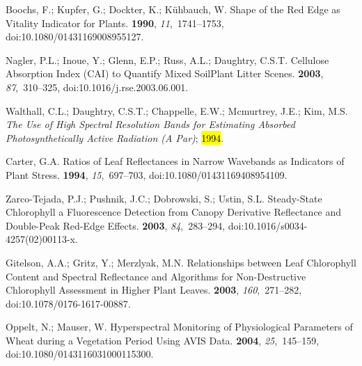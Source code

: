 \documentclass[remotesensing,article,accept,moreauthors,pdftex]{Definitions/mdpi}
\begin{document}
\begin{thebibliography}{999}
Boochs, F.; Kupfer, G.; Dockter, K.; K{\"u}hbauch, W.
\newblock Shape of the Red Edge as Vitality Indicator for Plants.
 {\bf 1990}, {\em
  11},~1741--1753, doi:10.1080/01431169008955127.

Nagler, P.L.; Inoue, Y.; Glenn, E.P.; Russ, A.L.; Daughtry, C.S.T.
\newblock Cellulose Absorption Index ({{CAI}}) to Quantify Mixed
  Soil\textendash Plant Litter Scenes.
 {\bf 2003}, {\em 87},~310--325, doi:10.1016/j.rse.2003.06.001.

Walthall, C.L.; Daughtry, C.S.T.; Chappelle, E.W.; Mcmurtrey, J.E.; Kim, M.S.
\newblock \emph{The {{Use}} of {{High Spectral Resolution Bands}} for {{Estimating
  Absorbed Photosynthetically Active Radiation}} ({{A Par}})}; { \hl{1994}}.

Carter, G.A.
\newblock Ratios of Leaf Reflectances in Narrow Wavebands as Indicators of
  Plant Stress.
 {\bf 1994}, {\em
  15},~697--703, doi:10.1080/01431169408954109.

{Zarco-Tejada}, P.J.; Pushnik, J.C.; Dobrowski, S.; Ustin, S.L.
\newblock Steady-State Chlorophyll a Fluorescence Detection from Canopy
  Derivative Reflectance and Double-Peak Red-Edge Effects.
 {\bf 2003}, {\em 84},~283--294, doi:10.1016/s0034-4257(02)00113-x.

Gitelson, A.A.; Gritz, Y.; Merzlyak, M.N.
\newblock Relationships between Leaf Chlorophyll Content and Spectral
  Reflectance and Algorithms for Non-Destructive Chlorophyll Assessment in
  Higher Plant Leaves.
 {\bf 2003}, {\em 160},~271--282, doi:10.1078/0176-1617-00887.

Oppelt, N.; Mauser, W.
\newblock Hyperspectral Monitoring of Physiological Parameters of Wheat during
  a Vegetation Period Using {{AVIS}} Data.
 {\bf 2004}, {\em
  25},~145--159, doi:10.1080/0143116031000115300.


\end{thebibliography}
\end{document}
